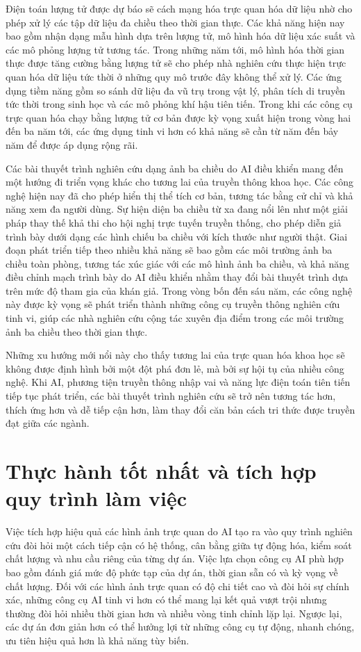 Điện toán lượng tử được dự báo sẽ cách mạng hóa trực quan hóa dữ liệu nhờ cho phép xử lý các tập dữ liệu đa chiều theo thời gian thực. Các khả năng hiện nay bao gồm nhận dạng mẫu hình dựa trên lượng tử, mô hình hóa dữ liệu xác suất và các mô phỏng lượng tử tương tác. Trong những năm tới, mô hình hóa thời gian thực được tăng cường bằng lượng tử sẽ cho phép nhà nghiên cứu thực hiện trực quan hóa dữ liệu tức thời ở những quy mô trước đây không thể xử lý. Các ứng dụng tiềm năng gồm so sánh dữ liệu đa vũ trụ trong vật lý, phân tích di truyền tức thời trong sinh học và các mô phỏng khí hậu tiên tiến. Trong khi các công cụ trực quan hóa chạy bằng lượng tử cơ bản được kỳ vọng xuất hiện trong vòng hai đến ba năm tới, các ứng dụng tinh vi hơn có khả năng sẽ cần từ năm đến bảy năm để được áp dụng rộng rãi.

Các bài thuyết trình nghiên cứu dạng ảnh ba chiều do AI điều khiển mang đến một hướng đi triển vọng khác cho tương lai của truyền thông khoa học. Các công nghệ hiện nay đã cho phép hiển thị thể tích cơ bản, tương tác bằng cử chỉ và khả năng xem đa người dùng. Sự hiện diện ba chiều từ xa đang nổi lên như một giải pháp thay thế khả thi cho hội nghị trực tuyến truyền thống, cho phép diễn giả trình bày dưới dạng các hình chiếu ba chiều với kích thước như người thật. Giai đoạn phát triển tiếp theo nhiều khả năng sẽ bao gồm các môi trường ảnh ba chiều toàn phòng, tương tác xúc giác với các mô hình ảnh ba chiều, và khả năng điều chỉnh mạch trình bày do AI điều khiển nhằm thay đổi bài thuyết trình dựa trên mức độ tham gia của khán giả. Trong vòng bốn đến sáu năm, các công nghệ này được kỳ vọng sẽ phát triển thành những công cụ truyền thông nghiên cứu tinh vi, giúp các nhà nghiên cứu cộng tác xuyên địa điểm trong các môi trường ảnh ba chiều theo thời gian thực.

Những xu hướng mới nổi này cho thấy tương lai của trực quan hóa khoa học sẽ không được định hình bởi một đột phá đơn lẻ, mà bởi sự hội tụ của nhiều công nghệ. Khi AI, phương tiện truyền thông nhập vai và năng lực điện toán tiên tiến tiếp tục phát triển, các bài thuyết trình nghiên cứu sẽ trở nên tương tác hơn, thích ứng hơn và dễ tiếp cận hơn, làm thay đổi căn bản cách tri thức được truyền đạt giữa các ngành.

\section{Thực hành tốt nhất và tích hợp quy trình làm việc}

Việc tích hợp hiệu quả các hình ảnh trực quan do AI tạo ra vào quy trình nghiên cứu đòi hỏi một cách tiếp cận có hệ thống, cân bằng giữa tự động hóa, kiểm soát chất lượng và nhu cầu riêng của từng dự án. Việc lựa chọn công cụ AI phù hợp bao gồm đánh giá mức độ phức tạp của dự án, thời gian sẵn có và kỳ vọng về chất lượng. Đối với các hình ảnh trực quan có độ chi tiết cao và đòi hỏi sự chính xác, những công cụ AI tinh vi hơn có thể mang lại kết quả vượt trội nhưng thường đòi hỏi nhiều thời gian hơn và nhiều vòng tinh chỉnh lặp lại. Ngược lại, các dự án đơn giản hơn có thể hưởng lợi từ những công cụ tự động, nhanh chóng, ưu tiên hiệu quả hơn là khả năng tùy biến.

